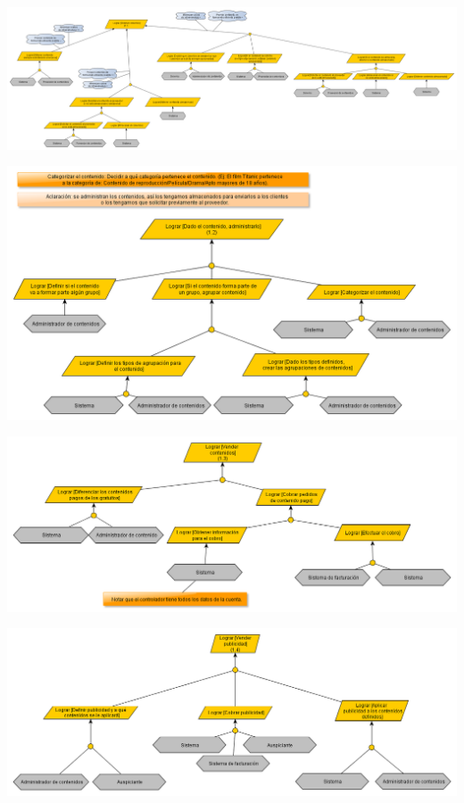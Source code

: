 \documentclass[11pt, a4paper, spanish]{article}
\begin{document}
\newpage
	\begin{center}
		\includegraphics[scale=0.35]{Diagramas/1-1ModelodeObjetivosObtenercontenido.png}
	\end{center}
\newpage
	\begin{center}
		\includegraphics[scale=0.35]{Diagramas/1-2ModelodeObjetivosAdministrarcontenido.png}
	\end{center}
\newpage
	\begin{center}
		\includegraphics[scale=0.35]{Diagramas/1-3ModelodeObjetivosVendercontenido.png}
	\end{center}
\newpage
	\begin{center}
		\includegraphics[scale=0.35]{Diagramas/1-4ModelodeObjetivosVenderpublicidad.png}
	\end{center}
\end{document}

